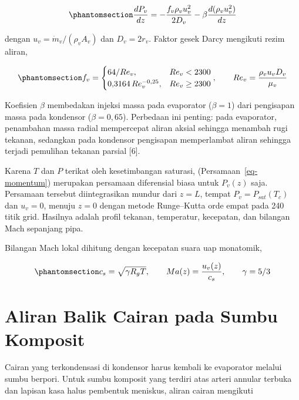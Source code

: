 \documentclass[
  indonesian,
  12pt,
  a4paper,
]{report}
\begin{document}
\begin{equation}\protect\phantomsection\label{eq-momentum}{\frac{dP_v}{dz} = -\frac{f_v \rho_v u_v^{2}}{2 D_v} - \beta \frac{d(\rho_v u_v^{2})}{dz}}\end{equation}

dengan \(u_v = \dot m_v/(\rho_v A_v)\) dan \(D_v = 2 r_v\). Faktor gesek
Darcy mengikuti rezim aliran,

\begin{equation}\protect\phantomsection\label{eq-fv}{f_v = \begin{cases} 64/Re_v, & Re_v < 2300 \\ 0{,}3164\,Re_v^{-0{,}25}, & Re_v \ge 2300 \end{cases}, \qquad Re_v = \frac{\rho_v u_v D_v}{\mu_v}}\end{equation}

Koefisien \(\beta\) membedakan injeksi massa pada evaporator
(\(\beta = 1\)) dari pengisapan massa pada kondensor
(\(\beta = 0{,}65\)). Perbedaan ini penting: pada evaporator, penambahan
massa radial mempercepat aliran aksial sehingga menambah rugi tekanan,
sedangkan pada kondensor pengisapan memperlambat aliran sehingga terjadi
pemulihan tekanan parsial {[}6{]}.

Karena \(T\) dan \(P\) terikat oleh kesetimbangan saturasi,
(Persamaan~\ref{eq-momentum}) merupakan persamaan diferensial biasa
untuk \(P_v(z)\) saja. Persamaan tersebut diintegrasikan mundur dari
\(z = L\), tempat \(P_v = P_{sat}(T_c)\) dan \(u_v = 0\), menuju
\(z = 0\) dengan metode Runge--Kutta orde empat pada 240 titik grid.
Hasilnya adalah profil tekanan, temperatur, kecepatan, dan bilangan Mach
sepanjang pipa.

Bilangan Mach lokal dihitung dengan kecepatan suara uap monatomik,

\begin{equation}\protect\phantomsection\label{eq-mach}{c_s = \sqrt{\gamma R_g T}, \qquad Ma(z) = \frac{u_v(z)}{c_s}, \qquad \gamma = 5/3}\end{equation}

\section{Aliran Balik Cairan pada Sumbu
Komposit}\label{aliran-balik-cairan-pada-sumbu-komposit}

Cairan yang terkondensasi di kondensor harus kembali ke evaporator
melalui sumbu berpori. Untuk sumbu komposit yang terdiri atas arteri
annular terbuka dan lapisan kasa halus pembentuk meniskus, aliran cairan
mengikuti
\end{document}
